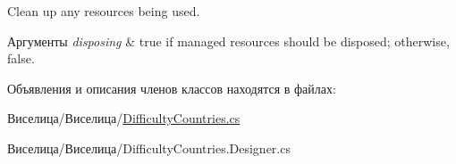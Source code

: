 Clean up any resources being used. 


\begin{DoxyParams}{Аргументы}
{\em disposing} & true if managed resources should be disposed; otherwise, false.\\
\hline
\end{DoxyParams}


Объявления и описания членов классов находятся в файлах\+:\begin{DoxyCompactItemize}
\item 
Виселица/Виселица/\hyperlink{_difficulty_countries_8cs}{Difficulty\+Countries.\+cs}\item 
Виселица/Виселица/Difficulty\+Countries.\+Designer.\+cs\end{DoxyCompactItemize}
